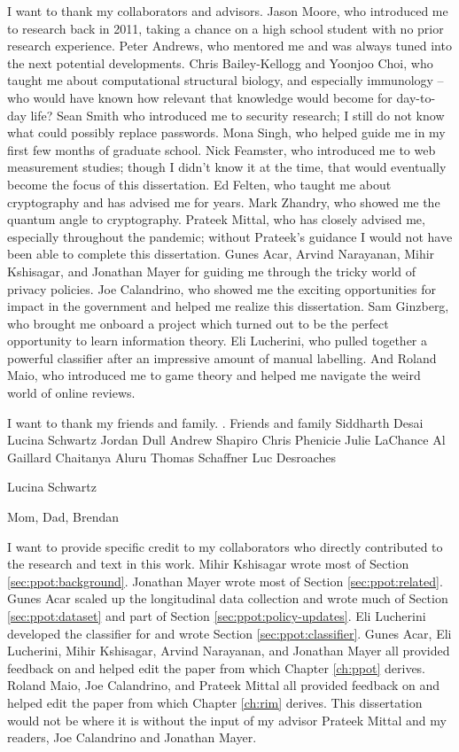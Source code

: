 I want to thank my collaborators and advisors. Jason Moore, who introduced me to research back in 2011, taking a chance on a high school student with no prior research experience. Peter Andrews, who mentored me and was always tuned into the next potential developments. Chris Bailey-Kellogg and Yoonjoo Choi, who taught me about computational structural biology, and especially immunology -- who would have known how relevant that knowledge would become for day-to-day life? Sean Smith who introduced me to security research; I still do not know what could possibly replace passwords. Mona Singh, who helped guide me in my first few months of graduate school. Nick Feamster, who introduced me to web measurement studies; though I didn't know it at the time, that would eventually become the focus of this dissertation. Ed Felten, who taught me about cryptography and has advised me for years. Mark Zhandry, who showed me the quantum angle to cryptography. Prateek Mittal, who has closely advised me, especially throughout the pandemic; without Prateek's guidance I would not have been able to complete this dissertation. Gunes Acar, Arvind Narayanan, Mihir Kshisagar, and Jonathan Mayer for guiding me through the tricky world of privacy policies. Joe Calandrino, who showed me the exciting opportunities for impact in the government and helped me realize this dissertation. Sam Ginzberg, who brought me onboard a project which turned out to be the perfect opportunity to learn information theory. Eli Lucherini, who pulled together a powerful classifier after an impressive amount of manual labelling. And Roland Maio, who introduced me to game theory and helped me navigate the weird world of online reviews.

I want to thank my friends and family. .
Friends and family
Siddharth Desai
Lucina Schwartz
Jordan Dull
Andrew Shapiro
Chris Phenicie
Julie LaChance
Al Gaillard
Chaitanya Aluru
Thomas Schaffner
Luc Desroaches

Lucina Schwartz

Mom, Dad, Brendan

I want to provide specific credit to my collaborators who directly contributed to the research and text in this work. Mihir Kshisagar wrote most of Section \ref{sec:ppot:background}. Jonathan Mayer wrote most of Section \ref{sec:ppot:related}. Gunes Acar scaled up the longitudinal data collection and wrote much of Section \ref{sec:ppot:dataset} and part of Section \ref{sec:ppot:policy-updates}. Eli Lucherini developed the classifier for and wrote Section \ref{sec:ppot:classifier}. Gunes Acar, Eli Lucherini, Mihir Kshisagar, Arvind Narayanan, and Jonathan Mayer all provided feedback on and helped edit the paper from which Chapter \ref{ch:ppot} derives. Roland Maio, Joe Calandrino, and Prateek Mittal all provided feedback on and helped edit the paper from which Chapter \ref{ch:rim} derives. This dissertation would not be where it is without the input of my advisor Prateek Mittal and my readers, Joe Calandrino and Jonathan Mayer.
